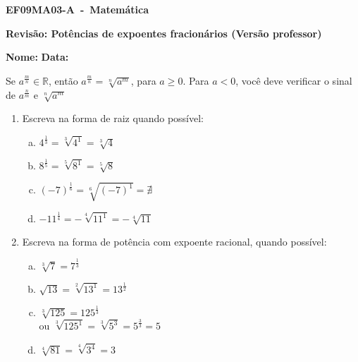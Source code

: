 \documentclass[a4paper,14pt]{article}
\begin{document}
	
	\noindent\textbf{EF09MA03-A~-~Matemática} 
	
	\begin{center}
		\textbf{Revisão: Potências de expoentes fracionários (Versão professor)}
	\end{center}
	
	
	\noindent\textbf{Nome:} \underline{\hspace{10cm}}
    \noindent\textbf{Data:} \underline{\hspace{4cm}}
	
	
	\begin{multicols}{2}
		Se $a^\frac{m}{n} \in \mathbb{R}$, então $a^\frac{m}{n} = \sqrt[n]{a^m}$, para $a \geq 0$. Para $a < 0$, você deve verificar o sinal de $a^\frac{n}{m}$ e $\sqrt[n]{a^m}$
	\begin{enumerate}	
		\item Escreva na forma de raiz quando possível:
		\begin{enumerate}[a)]
			\item $4^\frac{1}{3} = \sqrt[3]{4^1} = \sqrt[3]{4}$ \\
			\item $8^\frac{1}{5} = \sqrt[5]{8^1} = \sqrt[5]{8} $\\
			\item $(-7)^\frac{1}{6} = \sqrt[6]{(-7)^1} = \nexists$ \\
			\item $-11^\frac{1}{4} = - \sqrt[4]{11^1} = - \sqrt[4]{11} $ \\
	    \end{enumerate}
        \item Escreva na forma de potência com expoente racional, quando possível:
        \begin{enumerate}[a)]
        	\item $\sqrt[3]{7} = 7^\frac{1}{3}$ \\
        	\item $\sqrt{13} = \sqrt[2]{13^1} = 13^\frac{1}{2}$ \\
        	\item $\sqrt[3]{125} = 125^\frac{1}{3}$ \\ ou $\sqrt[3]{125^1} = \sqrt[3]{5^3} = 5^\frac{3}{3} = 5$ \\
        	\item $\sqrt[4]{81} = \sqrt[4]{3^4} = 3$ \\

\end{enumerate}
\end{enumerate}
\end{multicols}
\end{document}

